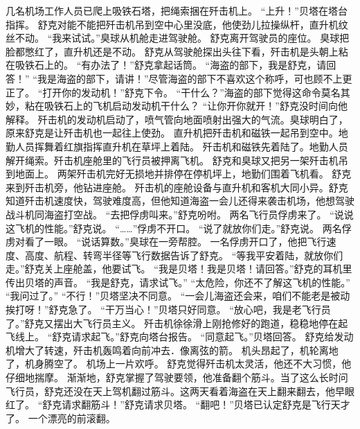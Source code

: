 \documentclass[a4paper,12pt,UTF8,twoside]{ctexbook}
\begin{document}
        几名机场工作人员已爬上吸铁石塔，把绳索捆在歼击机上。 
        “上升！”贝塔在塔台指挥。 
        舒克对能不能把歼击机吊到空中心里没底，他使劲儿拉操纵杆，直升机纹丝不动。 
        “我来试试。”臭球从机舱走进驾驶舱。 
        舒克离开驾驶员的座位。 
        臭球把脸都憋红了，直升机还是不动。 
        舒克从驾驶舱探出头往下看，歼击机是头朝上粘在吸铁石上的。 
        “有办法了！”舒克拿起话筒。 
        “海盗的部下，我是舒克，请回答！” 
        “我是海盗的部下，请讲！”尽管海盗的部下不喜欢这个称呼，可也顾不上更正了。 
        “打开你的发动机！”舒克下令。 
        “干什么？”海盗的部下觉得这命令莫名其妙，粘在吸铁石上的飞机启动发动机干什么？ 
        “让你开你就开！”舒克没时间向他解释。 
        歼击机的发动机启动了，喷气管向地面喷射出强大的气流。臭球明白了，原来舒克是让歼击机也一起往上使劲。 
        直升机把歼击机和磁铁一起吊到空中。地勤人员挥舞着红旗指挥直升机在草坪上着陆。 
        歼击机和磁铁先着陆了。地勤人员解开绳索。歼击机座舱里的飞行员被押离飞机。 
        舒克和臭球又把另一架歼击机吊到地面上。 
        两架歼击机完好无损地并排停在停机坪上，地勤们围着飞机看。 
        舒克来到歼击机旁，他钻进座舱。 
        歼击机的座舱设备与直升机和客机大同小异。舒克知道歼击机速度快，驾驶难度高，但他知道海盗一会儿还得来袭击机场，他想驾驶战斗机同海盗打空战。 
        “去把俘虏叫来。”舒克吩咐。 
        两名飞行员俘虏来了。 
        “说说这飞机的性能。”舒克说。 
        “……”俘虏不开口。 
        “说了就放你们走。”舒克说。 
        两名俘虏对看了一眼。 
        “说话算数。”臭球在一旁帮腔。 
        一名俘虏开口了，他把飞行速度、高度、航程、转弯半径等飞行数据告诉了舒克。 
        “等我平安着陆，就放你们走。”舒克关上座舱盖，他要试飞。 
        “我是贝塔！我是贝塔！请回答。”舒克的耳机里传出贝塔的声音。 
        “我是舒克，请求试飞。” 
        “太危险，你还不了解这飞机的性能。” 
        “我问过了。” 
        “不行！”贝塔坚决不同意。 
        “一会儿海盗还会来，咱们不能老是被动挨打呀！”舒克急了。 
        “干万当心！”贝塔只好同意。 
        “放心吧，我是老飞行员了。”舒克又摆出大飞行员主义。 
        歼击机徐徐滑上刚抢修好的跑道，稳稳地停在起飞线上。 
        “舒克请求起飞。”舒克向塔台报告。 
        “同意起飞。”贝塔回答。 
        舒克给发动机增大了转速，歼击机轰鸣着向前冲去．像离弦的箭。 
        机头昂起了，机轮离地了，机身腾空了。 
        机场上一片欢呼。 
        舒克觉得歼击机太灵活，他还不大习惯，他仔细地揣摩。 
        渐渐地，舒克掌握了驾驶要领，他准备翻个筋斗。当了这么长时问飞行员，舒克还没在天上驾机翻过筋斗。这两天看着海盗在天上翻来翻去，他早眼红了。 
        “舒克请求翻筋斗！”舒克请求贝塔。 
        “翻吧！”贝塔已认定舒克是飞行天才了。 
        一个漂亮的前滚翻。 
\end{document}
